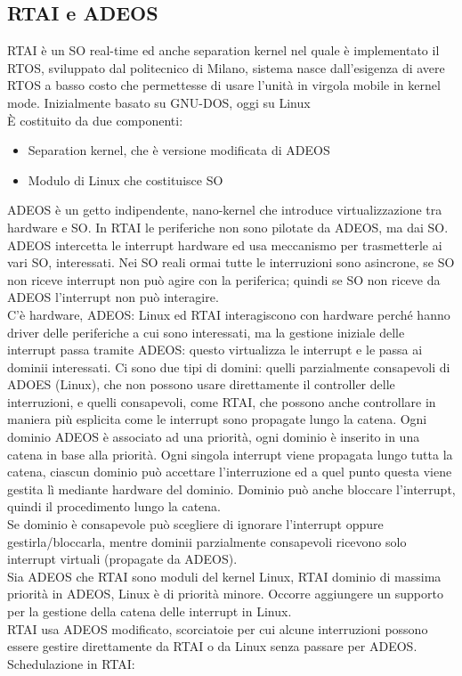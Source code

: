 \documentclass{article}
\begin{document}
\subsection{RTAI e ADEOS}
RTAI è un SO real-time ed anche separation kernel nel quale è implementato il RTOS, sviluppato dal politecnico di Milano, sistema nasce dall'esigenza di avere RTOS a basso costo che permettesse di usare l'unità in virgola mobile in kernel mode. Inizialmente basato su GNU-DOS, oggi su Linux\\ È costituito da due componenti:
\begin{itemize}
\item Separation kernel, che è versione modificata di ADEOS
\item Modulo di Linux che costituisce SO
\end{itemize}
ADEOS è un getto indipendente, nano-kernel che introduce virtualizzazione tra hardware e SO. In RTAI le periferiche non sono pilotate da ADEOS, ma dai SO. ADEOS intercetta le interrupt hardware ed usa meccanismo per trasmetterle ai vari SO, interessati. Nei SO reali ormai tutte le interruzioni sono asincrone, se SO non riceve interrupt non può agire con la periferica; quindi se SO non riceve da ADEOS l'interrupt non può interagire.\\ C'è hardware, ADEOS: Linux ed RTAI interagiscono con hardware perché hanno driver delle periferiche a cui sono interessati, ma la gestione iniziale delle interrupt passa tramite ADEOS: questo virtualizza le interrupt e le passa ai dominii interessati. Ci sono due tipi di domini: quelli parzialmente consapevoli di ADOES (Linux), che non possono usare direttamente il controller delle interruzioni, e quelli consapevoli, come RTAI, che possono anche controllare in maniera più esplicita come le interrupt sono propagate lungo la catena. Ogni dominio ADEOS è associato ad una priorità, ogni dominio è inserito in una catena in base alla priorità. Ogni singola interrupt viene propagata lungo tutta la catena, ciascun dominio può accettare l'interruzione ed a quel punto questa viene gestita lì mediante hardware del dominio. Dominio può anche bloccare l'interrupt, quindi il procedimento lungo la catena.\\ Se dominio è consapevole può scegliere di ignorare l'interrupt oppure gestirla/bloccarla, mentre dominii parzialmente consapevoli ricevono solo interrupt virtuali (propagate da ADEOS).\\ Sia ADEOS che RTAI sono moduli del kernel Linux, RTAI dominio di massima priorità in ADEOS, Linux è di priorità minore. Occorre aggiungere un supporto per la gestione della catena delle interrupt in Linux.\\ RTAI usa ADEOS modificato, scorciatoie per cui alcune interruzioni possono essere gestire direttamente da RTAI o da Linux senza passare per ADEOS.\\ Schedulazione in RTAI:
\end{document}
